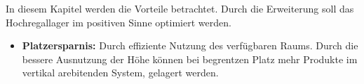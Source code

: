 In diesem Kapitel werden die Vorteile betrachtet. Durch die Erweiterung soll das Hochregallager im positiven Sinne  optimiert werden.
\begin{itemize}
	\item \textbf{Platzersparnis:}
	Durch effiziente Nutzung des verfügbaren Raums. Durch die bessere Ausnutzung der Höhe können bei begrentzen Platz mehr Produkte im vertikal arebitenden System, gelagert werden.
	\autocite{frazelle2002}
	

\end{itemize}
